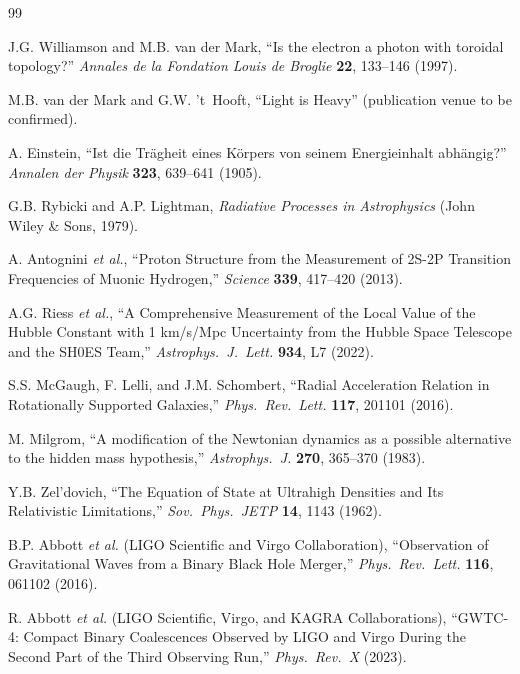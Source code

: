 \documentclass[aps,prd,twocolumn,superscriptaddress,amsmath,amssymb,nofootinbib,floatfix]{revtex4-2}
\begin{document}
\begin{thebibliography}{99}

J.G. Williamson and M.B. van der Mark,
``Is the electron a photon with toroidal topology?''
\emph{Annales de la Fondation Louis de Broglie} \textbf{22}, 133--146 (1997).

M.B. van der Mark and G.W. 't~Hooft,
``Light is Heavy''
(publication venue to be confirmed).

A. Einstein,
``Ist die Tr\"agheit eines K\"orpers von seinem Energieinhalt abh\"angig?''
\emph{Annalen der Physik} \textbf{323}, 639--641 (1905).

G.B. Rybicki and A.P. Lightman,
\emph{Radiative Processes in Astrophysics}
(John Wiley \& Sons, 1979).

A. Antognini \emph{et al.},
``Proton Structure from the Measurement of 2S-2P Transition Frequencies of Muonic Hydrogen,''
\emph{Science} \textbf{339}, 417--420 (2013).

A.G. Riess \emph{et al.},
``A Comprehensive Measurement of the Local Value of the Hubble Constant with 1 km/s/Mpc Uncertainty from the Hubble Space Telescope and the SH0ES Team,''
\emph{Astrophys.\ J.\ Lett.} \textbf{934}, L7 (2022).

S.S. McGaugh, F. Lelli, and J.M. Schombert,
``Radial Acceleration Relation in Rotationally Supported Galaxies,''
\emph{Phys.\ Rev.\ Lett.} \textbf{117}, 201101 (2016).

M. Milgrom,
``A modification of the Newtonian dynamics as a possible alternative to the hidden mass hypothesis,''
\emph{Astrophys.\ J.} \textbf{270}, 365--370 (1983).

Y.B. Zel'dovich,
``The Equation of State at Ultrahigh Densities and Its Relativistic Limitations,''
\emph{Sov.\ Phys.\ JETP} \textbf{14}, 1143 (1962).

B.P. Abbott \emph{et al.} (LIGO Scientific and Virgo Collaboration),
``Observation of Gravitational Waves from a Binary Black Hole Merger,''
\emph{Phys.\ Rev.\ Lett.} \textbf{116}, 061102 (2016).

R. Abbott \emph{et al.} (LIGO Scientific, Virgo, and KAGRA Collaborations),
``GWTC-4: Compact Binary Coalescences Observed by LIGO and Virgo During the Second Part of the Third Observing Run,''
\emph{Phys.\ Rev.\ X} (2023).


\end{thebibliography}
\end{document}
